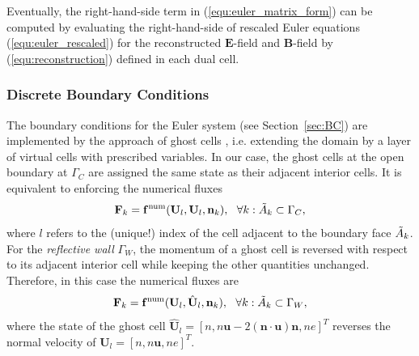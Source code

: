 \documentclass{article}
\begin{document}
Eventually, the right-hand-side term in (\ref{equ:euler_matrix_form}) can be computed by
evaluating the right-hand-side of rescaled Euler equations (\ref{equ:euler_rescaled}) for
the reconstructed $\mathbf{E}$-field and $\mathbf{B}$-field by (\ref{equ:reconstruction})
defined in each dual cell.

\subsubsection{Discrete Boundary Conditions}

The boundary conditions for the Euler system (see Section~\ref{sec:BC}) are implemented by
the approach of ghost cells \cite[][Ch. 7]{leveque_2007}, i.e. extending the domain by a
layer of virtual cells with prescribed variables. In our case, the ghost cells at the open
boundary at $\Gamma_C$ are assigned the same state as their adjacent interior cells. It is
equivalent to enforcing the numerical fluxes
\begin{equation} \label{equ:discrete_open_bc}
    \mathbf{F}_k = {\mathbf{f}^\text{num}}(\mathbf{U}_l, \mathbf{U}_l, \mathbf{n}_k), \ \ \forall k: \Tilde{A}_k \subset \Gamma_C,
\end{equation}
where $l$ refers to the (unique!) index of the cell adjacent to the boundary face
$\Tilde{A}_k$. For the \emph{reflective wall} $\Gamma_W$, the momentum of a ghost cell is
reversed with respect to its adjacent interior cell while keeping the other quantities
unchanged. Therefore, in this case the numerical fluxes are
\begin{equation} \label{equ:discrete_wall_bc} \mathbf{F}_k =
  \mathbf{f}^\text{num}(\mathbf{U}_l, \hat{\mathbf{U}}_l, \mathbf{n}_k), \ \ \forall k:
  \Tilde{A}_k \subset \Gamma_W,
\end{equation}
where the state of the ghost cell
$\hat{\mathbf{U}}_l = [n, n\mathbf{u} - 2(\mathbf{n}\cdot\mathbf{u})\mathbf{n}, ne]^T$
reverses the normal velocity of $\mathbf{U}_l = [n, n\mathbf{u}, ne]^T$.
\end{document}
